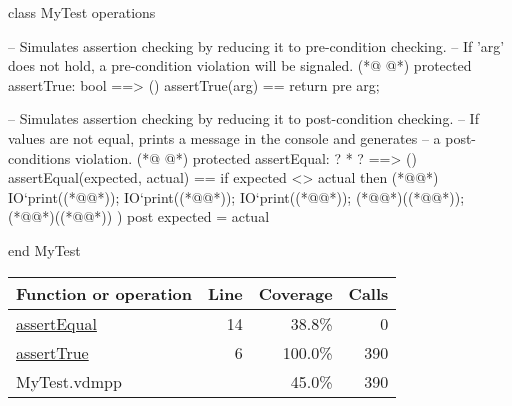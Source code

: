 \begin{vdmpp}[breaklines=true]
class MyTest
operations
 
 -- Simulates assertion checking by reducing it to pre-condition checking.
 -- If 'arg' does not hold, a pre-condition violation will be signaled.
(*@
\label{assertTrue:6}
@*)
 protected assertTrue: bool ==> ()
 assertTrue(arg) == 
  return 
 pre arg;
  
 -- Simulates assertion checking by reducing it to post-condition checking.
 -- If values are not equal, prints a message in the console and generates 
 -- a post-conditions violation.
(*@
\label{assertEqual:14}
@*)
 protected assertEqual: ? * ? ==> ()
 assertEqual(expected, actual) == 
  if expected <> actual then (*@\vdmnotcovered{(}@*)
     IO`print((*@@*));
     IO`print((*@@*)); 
     IO`print((*@@*));
     (*@@*)((*@@*));
     (*@@*)((*@@*))
  )
 post expected = actual

end MyTest
\end{vdmpp}
\bigskip
\begin{longtable}{|l|r|r|r|}
\hline
Function or operation & Line & Coverage & Calls \\
\hline
\hline
\hyperref[assertEqual:14]{assertEqual} & 14&38.8\% & 0 \\
\hline
\hyperref[assertTrue:6]{assertTrue} & 6&100.0\% & 390 \\
\hline
\hline
MyTest.vdmpp & & 45.0\% & 390 \\
\hline
\end{longtable}

